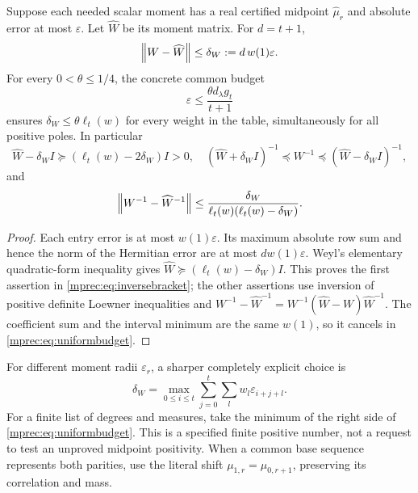 \documentclass[11pt]{article}
\begin{document}
\begin{mprectheorem}\label{mprec:thm:budget}
Suppose each needed scalar moment has a real certified midpoint
$\widehat\mu_r$ and absolute error at most $\varepsilon$.
Let $\widehat W$ be its moment matrix. For $d=t+1$,
\begin{equation}\label{mprec:eq:deltaW}
 \left\lVert W-\widehat W\right\rVert\le\delta_W:=d\,w(1)\varepsilon.
\end{equation}
For every $0<\theta\le1/4$, the concrete common budget
\begin{equation}\label{mprec:eq:uniformbudget}
 \boxed{\varepsilon\le\frac{\theta d_\lambda g_t}{t+1}}
\end{equation}
ensures $\delta_W\le\theta\ell_t(w)$ for every weight in
the table, simultaneously for all positive poles. In particular
\begin{equation}\label{mprec:eq:inversebracket}
 \widehat W-\delta_W I\succeq(\ell_t(w)-2\delta_W)I>0,
 \quad
 (\widehat W+\delta_W I)^{-1}\preceq W^{-1}
 \preceq(\widehat W-\delta_W I)^{-1},
\end{equation}
and
\begin{equation}\label{mprec:eq:inverseerror}
 \left\lVert W^{-1}-\widehat W^{-1}\right\rVert
 \le\frac{\delta_W}{\ell_t(w)(\ell_t(w)-\delta_W)}.
\end{equation}
\end{mprectheorem}
\begin{proof}
Each entry error is at most $w(1)\varepsilon$. Its maximum
absolute row sum and hence the norm of the Hermitian error are
at most $d w(1)\varepsilon$. Weyl's elementary quadratic-form
inequality gives $\widehat W\succeq(\ell_t(w)-\delta_W)I$.
This proves the first assertion in \eqref{mprec:eq:inversebracket};
the other assertions use inversion of positive definite Loewner
inequalities and
$W^{-1}-\widehat W^{-1}=W^{-1}(\widehat W-W)\widehat W^{-1}$.
The coefficient sum and the interval minimum are the same $w(1)$,
so it cancels in \eqref{mprec:eq:uniformbudget}.
\end{proof}

For different moment radii $\varepsilon_r$, a sharper completely
explicit choice is
\[
 \delta_W=\max_{0\le i\le t}\sum_{j=0}^t
                \sum_lw_l\varepsilon_{i+j+l}.
\]
For a finite list of degrees and measures, take the minimum of the
right side of \eqref{mprec:eq:uniformbudget}. This is a specified finite
positive number, not a request to test an unproved midpoint
positivity. When a common base sequence represents both parities,
use the literal shift $\mu_{1,r}=\mu_{0,r+1}$, preserving its
correlation and mass.
\end{document}

